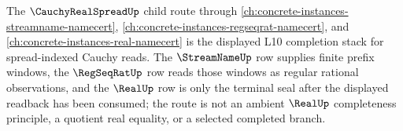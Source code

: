 The $\CauchyRealSpreadUp$ child route through \autoref{ch:concrete-instances-streamname-namecert}, \autoref{ch:concrete-instances-regseqrat-namecert}, and \autoref{ch:concrete-instances-real-namecert} is the displayed L10 completion stack for spread-indexed Cauchy reads. The $\StreamNameUp$ row supplies finite prefix windows, the $\RegSeqRatUp$ row reads those windows as regular rational observations, and the $\RealUp$ row is only the terminal seal after the displayed readback has been consumed; the route is not an ambient $\RealUp$ completeness principle, a quotient real equality, or a selected completed branch.
